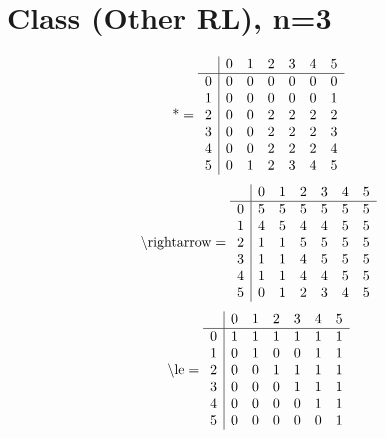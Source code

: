 \documentclass[11pt]{article}
\begin{document}
\section{Class (Other RL), n=3}
\[\text{*} = 
\begin{array}{r | r r r r r r}
 & 0 & 1 & 2 & 3 & 4 & 5 \\ \hline
0 & 0 & 0 & 0 & 0 & 0 & 0 \\
1 & 0 & 0 & 0 & 0 & 0 & 1 \\
2 & 0 & 0 & 2 & 2 & 2 & 2 \\
3 & 0 & 0 & 2 & 2 & 2 & 3 \\
4 & 0 & 0 & 2 & 2 & 2 & 4 \\
5 & 0 & 1 & 2 & 3 & 4 & 5 \\
\end{array}
\]
\[\text{\textbackslash rightarrow} = 
\begin{array}{r | r r r r r r}
 & 0 & 1 & 2 & 3 & 4 & 5 \\ \hline
0 & 5 & 5 & 5 & 5 & 5 & 5 \\
1 & 4 & 5 & 4 & 4 & 5 & 5 \\
2 & 1 & 1 & 5 & 5 & 5 & 5 \\
3 & 1 & 1 & 4 & 5 & 5 & 5 \\
4 & 1 & 1 & 4 & 4 & 5 & 5 \\
5 & 0 & 1 & 2 & 3 & 4 & 5 \\
\end{array}
\]
\[\text{\textbackslash le} = 
\begin{array}{r | r r r r r r}
 & 0 & 1 & 2 & 3 & 4 & 5 \\ \hline
0 & 1 & 1 & 1 & 1 & 1 & 1 \\
1 & 0 & 1 & 0 & 0 & 1 & 1 \\
2 & 0 & 0 & 1 & 1 & 1 & 1 \\
3 & 0 & 0 & 0 & 1 & 1 & 1 \\
4 & 0 & 0 & 0 & 0 & 1 & 1 \\
5 & 0 & 0 & 0 & 0 & 0 & 1 \\
\end{array}
\]
\end{document}
